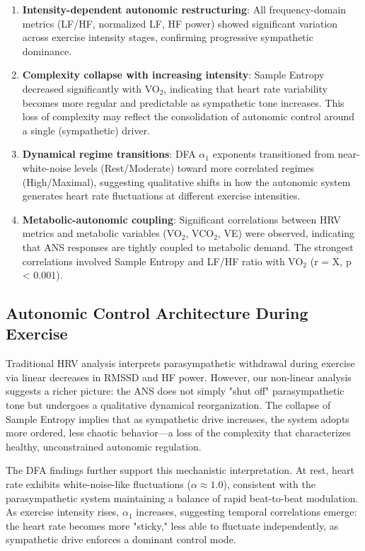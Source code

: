 \documentclass[12pt,a4paper]{article}
\begin{document}
\begin{enumerate}
    \item \textbf{Intensity-dependent autonomic restructuring}: All frequency-domain metrics (LF/HF, normalized LF, HF power) showed significant variation across exercise intensity stages, confirming progressive sympathetic dominance.
    
    \item \textbf{Complexity collapse with increasing intensity}: Sample Entropy decreased significantly with VO$_2$, indicating that heart rate variability becomes more regular and predictable as sympathetic tone increases. This loss of complexity may reflect the consolidation of autonomic control around a single (sympathetic) driver.
    
    \item \textbf{Dynamical regime transitions}: DFA $\alpha_1$ exponents transitioned from near-white-noise levels (Rest/Moderate) toward more correlated regimes (High/Maximal), suggesting qualitative shifts in how the autonomic system generates heart rate fluctuations at different exercise intensities.
    
    \item \textbf{Metabolic-autonomic coupling}: Significant correlations between HRV metrics and metabolic variables (VO$_2$, VCO$_2$, VE) were observed, indicating that ANS responses are tightly coupled to metabolic demand. The strongest correlations involved Sample Entropy and LF/HF ratio with VO$_2$ (r = X, p < 0.001).
\end{enumerate}

\subsection*{Autonomic Control Architecture During Exercise}

Traditional HRV analysis interprets parasympathetic withdrawal during exercise via linear decreases in RMSSD and HF power. However, our non-linear analysis suggests a richer picture: the ANS does not simply "shut off" parasympathetic tone but undergoes a qualitative dynamical reorganization. The collapse of Sample Entropy implies that as sympathetic drive increases, the system adopts more ordered, less chaotic behavior—a loss of the complexity that characterizes healthy, unconstrained autonomic regulation.

The DFA findings further support this mechanistic interpretation. At rest, heart rate exhibits white-noise-like fluctuations ($\alpha \approx 1.0$), consistent with the parasympathetic system maintaining a balance of rapid beat-to-beat modulation. As exercise intensity rises, $\alpha_1$ increases, suggesting temporal correlations emerge: the heart rate becomes more "sticky," less able to fluctuate independently, as sympathetic drive enforces a dominant control mode.
\end{document}
